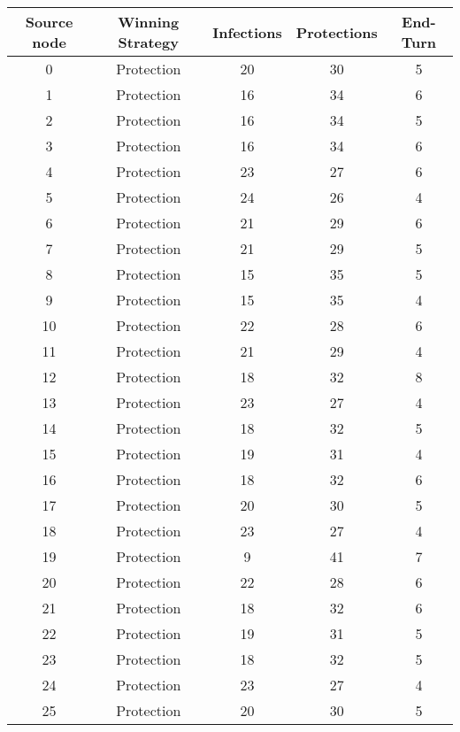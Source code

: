 \documentclass[results.tex]{subfiles}
\begin{document}
\begin{center}
  \begin{tabular}{| c || c | c | c | c |}
    \hline
    {\bfseries Source node} & {\bfseries Winning Strategy} & {\bfseries Infections} & {\bfseries Protections} & {\bfseries End-Turn} \\  %
    \hline\hline
    0 & Protection & 20 & 30 & 5 \\ 
    \hline
    1 & Protection & 16 & 34 & 6 \\ 
    \hline
    2 & Protection & 16 & 34 & 5 \\ 
    \hline
    3 & Protection & 16 & 34 & 6 \\ 
    \hline
    4 & Protection & 23 & 27 & 6 \\ 
    \hline
    5 & Protection & 24 & 26 & 4 \\ 
    \hline
    6 & Protection & 21 & 29 & 6 \\ 
    \hline
    7 & Protection & 21 & 29 & 5 \\ 
    \hline
    8 & Protection & 15 & 35 & 5 \\ 
    \hline
    9 & Protection & 15 & 35 & 4 \\ 
    \hline
    10 & Protection & 22 & 28 & 6 \\ 
    \hline
    11 & Protection & 21 & 29 & 4 \\ 
    \hline
    12 & Protection & 18 & 32 & 8 \\ 
    \hline
    13 & Protection & 23 & 27 & 4 \\ 
    \hline
    14 & Protection & 18 & 32 & 5 \\ 
    \hline
    15 & Protection & 19 & 31 & 4 \\ 
    \hline
    16 & Protection & 18 & 32 & 6 \\ 
    \hline
    17 & Protection & 20 & 30 & 5 \\ 
    \hline
    18 & Protection & 23 & 27 & 4 \\ 
    \hline
    19 & Protection & 9 & 41 & 7 \\ 
    \hline
    20 & Protection & 22 & 28 & 6 \\ 
    \hline
    21 & Protection & 18 & 32 & 6 \\ 
    \hline
    22 & Protection & 19 & 31 & 5 \\ 
    \hline
    23 & Protection & 18 & 32 & 5 \\ 
    \hline
    24 & Protection & 23 & 27 & 4 \\ 
    \hline
    25 & Protection & 20 & 30 & 5 \\ 

\end{tabular}
\end{center}
\end{document}
